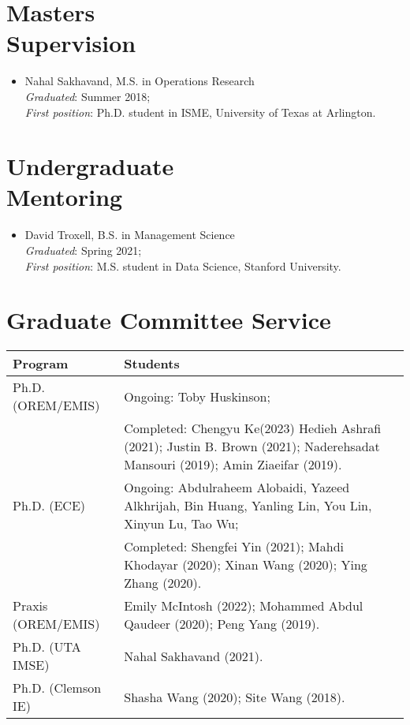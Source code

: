\documentclass[hyperref, margin]{myResume}
\begin{document}
\begin{resume}
\section{Masters \\Supervision}
	\begin{itemize}[leftmargin=*]\itemsep0em
		\item Nahal Sakhavand, M.S. in Operations Research\\		
		\emph{Graduated}: Summer 2018;\\ 
		\emph{First position}: Ph.D. student in ISME, University of Texas at Arlington.
	\end{itemize}
	\vspace{-0.2cm}	
	
\section{Undergraduate \\Mentoring}
	\begin{itemize}[leftmargin=*]\itemsep0em
		\item David Troxell, B.S. in Management Science\\		
		\emph{Graduated}: Spring 2021;\\
		\emph{First position}: M.S. student in Data Science, Stanford University.
	\end{itemize}
	
\section{Graduate Committee Service}
	\vspace*{0.5cm}
	\begin{table}[h!] \renewcommand{\arraystretch}{1.3}
		\begin{tabular}{p{} p{}}
			\hline
			Program & Students \\ 
			\hline
			Ph.D. (OREM/EMIS) 	& Ongoing: Toby Huskinson; \\[3pt] 
								& Completed: Chengyu Ke(2023) Hedieh Ashrafi (2021); Justin B. Brown (2021); Naderehsadat Mansouri (2019); Amin Ziaeifar (2019). \\[3pt] \hline
			Ph.D. (ECE)  		& Ongoing: Abdulraheem Alobaidi, Yazeed Alkhrijah, Bin Huang, Yanling Lin, You Lin, Xinyun Lu, Tao Wu; \\ [3pt]
								& Completed: Shengfei Yin (2021); Mahdi Khodayar (2020); Xinan Wang (2020); Ying Zhang (2020). \\ [3pt]\hline
			Praxis (OREM/EMIS)	& Emily McIntosh (2022); Mohammed Abdul Qaudeer (2020); Peng Yang (2019). \\ [3pt]\hline
			Ph.D. (UTA IMSE)	& Nahal Sakhavand (2021). \\ [3pt] \hline
			Ph.D. (Clemson IE)	& Shasha Wang (2020); Site Wang (2018). \\ [3pt]\hline
		\end{tabular}
	\end{table}
	

\end{resume}
\end{document}
